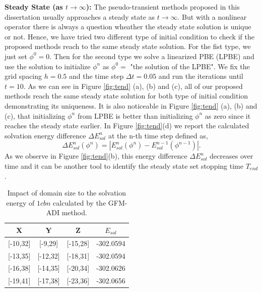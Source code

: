 {\bf Steady State (as $t\rightarrow \infty$):} The pseudo-transient methods proposed in this dissertation usually approaches a steady state as $t\rightarrow \infty$. But with a nonlinear operator there is always a question wheather the steady state solution is unique or not. 
Hence, we have tried two different type of initial condition to check if the proposed methods reach to the same steady state solution. For the fist type, we just set $\phi^0=0$. Then for the second type we solve a linearized PBE (LPBE) \cite{Zhao2011} and use the solution to initialize $\phi^n$ as $\phi^0 = $ "the solution of the LPBE". We fix the grid spacing $h = 0.5$ and the time step $\Delta t = 0.05$ and run the iterations until $t = 10$.
As we can see in Figure \ref{fig:tend} (a), (b) and (c), all of our proposed methods reach the same steady state solution for both type of initial condition demonstrating its uniqueness. It is also noticeable in Figure \ref{fig:tend} (a), (b) and (c), that initializing $\phi^n$ from LPBE is better than initializing $\phi^n$ as zero since it reaches the steady state earlier.     
  In Figure \ref{fig:tend}(d) we report the calculated solvation energy difference $\Delta E^n_{sol}$ at the n-th time step defined as,
\begin{equation}
	\Delta E^n_{sol}(\phi^n)= |E^n_{sol}(\phi^n)-E^{n-1}_{sol}(\phi^{n-1})|.
\end{equation}
As we observe in Figure \ref{fig:tend}(b), this energy difference $\Delta E^n_{sol}$ decreases over time and it can be another tool to identify the steady state set stopping time $T_{end}$.
\begin{table}[!t]
\begin{center}
\begin{tabular}{c c c c }
\hline
X            & Y            & Z            & $E_{sol}$    \\ \hline
{[}-10,32{]} & {[}-9,29{]}  & {[}-15,28{]} & -302.0594 \\ \hline
{[}-13,35{]} & {[}-12,32{]} & {[}-18,31{]} & -302.0594\\ \hline
{[}-16,38{]} & {[}-14,35{]} & {[}-20,34{]} & -302.0626 \\ \hline
{[}-19,41{]} & {[}-17,38{]} & {[}-23,36{]} & -302.0656\\ \hline
\end{tabular}
\end{center}
\caption{Impact of domain size to the solvation energy of $1cbn$ calculated by the GFM-ADI method.}
\label{tab:domain}
\end{table}

